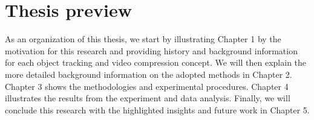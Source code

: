 \section{Thesis preview}
\label{sec:introduction/thesis_preview}

As an organization of this thesis, we start by illustrating Chapter 1 by the motivation for this research and providing history and background information for each object tracking and video compression concept. We will then explain the more detailed background information on the adopted methods in Chapter 2. Chapter 3 shows the methodologies and experimental procedures. Chapter 4 illustrates the results from the experiment and data analysis. Finally, we will conclude this research with the highlighted insights and future work in Chapter 5.